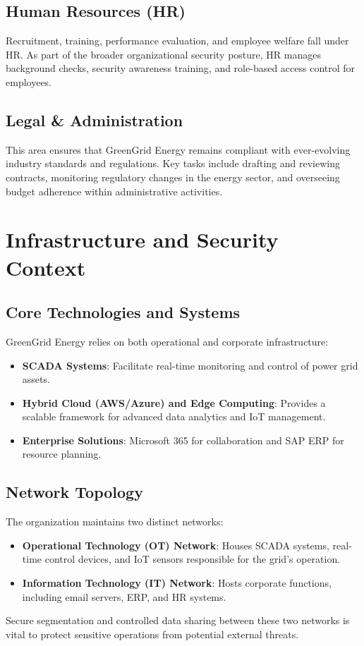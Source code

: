 \subsection{Human Resources (HR)}
Recruitment, training, performance evaluation, and employee welfare fall under HR. As part of the broader organizational security posture, HR manages background checks, security awareness training, and role-based access control for employees.

\subsection{Legal \& Administration}
This area ensures that GreenGrid Energy remains compliant with ever-evolving industry standards and regulations. Key tasks include drafting and reviewing contracts, monitoring regulatory changes in the energy sector, and overseeing budget adherence within administrative activities.

\section{Infrastructure and Security Context}

\subsection{Core Technologies and Systems}
GreenGrid Energy relies on both operational and corporate infrastructure:
\begin{itemize}
    \item \textbf{SCADA Systems}: Facilitate real-time monitoring and control of power grid assets.
    \item \textbf{Hybrid Cloud (AWS/Azure) and Edge Computing}: Provides a scalable framework for advanced data analytics and IoT management.
    \item \textbf{Enterprise Solutions}: Microsoft 365 for collaboration and SAP ERP for resource planning.
\end{itemize}

\subsection{Network Topology}
The organization maintains two distinct networks:
\begin{itemize}
    \item \textbf{Operational Technology (OT) Network}: Houses SCADA systems, real-time control devices, and IoT sensors responsible for the grid's operation.
    \item \textbf{Information Technology (IT) Network}: Hosts corporate functions, including email servers, ERP, and HR systems.
\end{itemize}
Secure segmentation and controlled data sharing between these two networks is vital to protect sensitive operations from potential external threats.

